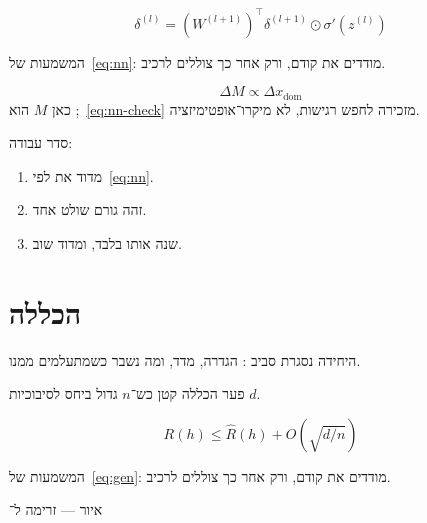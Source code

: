 \begin{equation}
\label{eq:nn}
\delta^{(l)}=(W^{(l+1)})^\top\delta^{(l+1)}\odot\sigma'(z^{(l)})
\end{equation}

המשמעות של~\eqref{eq:nn}: מודדים את  קודם, ורק אחר כך צוללים לרכיב.

\begin{equation}
\label{eq:nn-check}
\Delta M \propto \Delta x_{\mathrm{dom}}
\end{equation}
כאן $M$ הוא ;~\eqref{eq:nn-check} מזכירה לחפש רגישות, לא מיקרו־אופטימיזציה.

סדר עבודה:
\begin{enumerate}
\item[(\textbf{א})] מדוד את  לפי~\eqref{eq:nn}.
\item[(\textbf{ב})] זהה גורם שולט אחד.
\item[(\textbf{ג})] שנה אותו בלבד, ומדוד שוב.
\end{enumerate}

\chapter{הכללה}
\label{ch:gen}

היחידה נסגרת סביב : הגדרה, מדד, ומה נשבר כשמתעלמים ממנו.

\begin{thmbox}[frametitle={משפט — הכללה}]
פער הכללה קטן כש־$n$ גדול ביחס לסיבוכיות $d$.
\end{thmbox}

\begin{equation}
\label{eq:gen}
R(h)\le\hat R(h)+O\!\left(\sqrt{d/n}\right)
\end{equation}

המשמעות של~\eqref{eq:gen}: מודדים את  קודם, ורק אחר כך צוללים לרכיב.

\begin{tikzpic}
\end{tikzpic}
\begin{center}\small איור — זרימה ל־\end{center}

